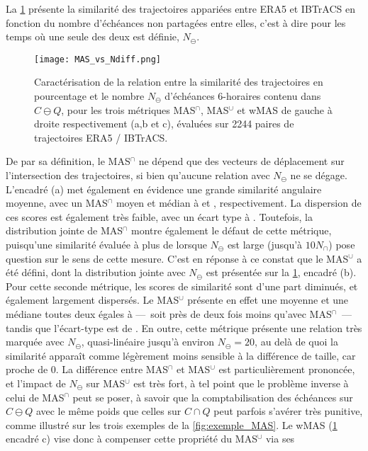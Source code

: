 \documentclass[../main.tex]{subfiles}
\begin{document}
La \cref{fig:MAS_Ndiff} présente la similarité des trajectoires appariées entre ERA5 et IBTrACS en fonction du nombre d'échéances non partagées entre elles,
c'est à dire pour les temps où une seule des deux est définie, $N_\ominus$.
%
\begin{figure}[htpb]
    \centering
    \texttt{[image: MAS\_vs\_Ndiff.png]}
    \caption{Caractérisation de la relation entre la similarité des trajectoires en pourcentage et le nombre $N_\ominus$ d'échéances \num{6}-horaires contenu
    dans $C \ominus Q$, pour les trois métriques MAS$^\cap$, MAS$^\cup$ et wMAS de gauche à droite respectivement (a,b et c), évaluées sur \num{2244} paires de
    trajectoires ERA5 / IBTrACS.}
    \label{fig:MAS_Ndiff}
\end{figure}
%
De par sa définition, le MAS$^\cap$ ne dépend que des vecteurs de déplacement sur l'intersection des trajectoires, si bien qu'aucune relation avec $N_\ominus$
ne se dégage. L'encadré (a) met également en évidence une grande similarité angulaire moyenne, avec un MAS$^\cap$ moyen et médian à  et ,
respectivement. La dispersion de ces scores est également très faible, avec un écart type à . Toutefois, la distribution jointe de MAS$^\cap$ montre
également le défaut de cette métrique, puisqu'une similarité évaluée à plus de  lorsque $N_\ominus$ est large (jusqu'à $10 N_\cap$) pose question sur
le sens de cette mesure. C'est en réponse à ce constat que le MAS$^\cup$ a été défini, dont la distribution jointe avec $N_\ominus$ est présentée sur la
\cref{fig:MAS_Ndiff}, encadré (b). Pour cette seconde métrique, les scores de similarité sont d'une part diminués, et également largement dispersés. Le
MAS$^\cup$ présente en effet une moyenne et une médiane toutes deux égales à  ---~soit près de deux fois moins qu'avec MAS$^\cap$~--- tandis que
l'écart-type est de . En outre, cette métrique présente une relation très marquée avec $N_\ominus$, quasi-linéaire jusqu'à environ $N_\ominus = 20$, au
delà de quoi la similarité apparaît comme légèrement moins sensible à la différence de taille, car proche de 0. La différence entre MAS$^\cap$ et MAS$^\cup$ est
particulièrement prononcée, et l'impact de $N_\ominus$ sur MAS$^\cup$ est très fort, à tel point que le problème inverse à celui de MAS$^\cap$ peut se poser, à
savoir que la comptabilisation des échéances sur $C \ominus Q$ avec le même poids que celles sur $C \cap Q$ peut parfois s'avérer très punitive, comme illustré
sur les trois exemples de la \cref{fig:exemple_MAS}. Le wMAS (\cref{fig:MAS_Ndiff} encadré c) vise donc à compenser cette propriété du MAS$^\cup$ via ses
\end{document}
